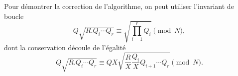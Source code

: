 \begin{remarque}
    Pour démontrer la correction de l'algorithme, on peut utiliser l'invariant
    de boucle \[Q\sqrt{R.Q_i\cdots Q_r} \equiv \sqrt{\prod_{i=1}^r Q_{i}}
    \pmod{N},\] dont la conservation découle de l'égalité \[Q\sqrt{R.Q_i\cdots
    Q_r} \equiv QX \sqrt{\frac{R}{X}\frac{Q_i}{X}Q_{i+1} \cdots Q_r}
    \pmod{N}.\]
\end{remarque}
